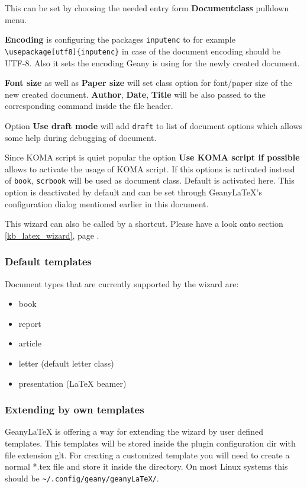 \documentclass[%
paper=a4,%
fontsize=11pt,%
twoside=false,%
DIV18,
headsepline,
plainheadsepline,
footsepline,
plainfootsepline,
bibliography=totoc,%
listof=totoc,%
BCOR10mm,%
parskip=half,%
openany,%
]{scrartcl}
\begin{document}
This can be set by choosing the needed entry form
\textbf{Documentclass} pulldown menu.

\textbf{Encoding} is configuring the packages \texttt{inputenc} to
for example \texttt{\textbackslash usepackage[utf8]\{inputenc\}} in
case of the document encoding should be UTF-8. Also it sets the
encoding Geany is using for the newly created document.

\textbf{Font size} as well as \textbf{Paper size} will set class option
for font/paper size of the new created document. \textbf{Author},
\textbf{Date}, \textbf{Title} will be also passed to the corresponding
command inside the file header.

Option \textbf{Use draft mode} will add \texttt{draft} to list of
document options which allows some help during debugging of document.

Since KOMA script is quiet popular the option \textbf{Use KOMA script
if possible} allows to activate the usage of KOMA script. If this
options is activated instead of \texttt{book}, \texttt{scrbook} will
be used as document class. Default is activated here. This option is
deactivated by default and can be set through Geany\LaTeX{}'s
configuration dialog mentioned earlier in this document.

This wizard can also be called by a shortcut. Please have a look onto
section \ref{kb_latex_wizard}, page \pageref{kb_latex_wizard}.

\subsubsection{Default templates}
Document types that are currently supported by the wizard are:
\begin{itemize}
	\item book
	\item report
	\item article
	\item letter (default letter class)
	\item presentation (\LaTeX{} beamer)
\end{itemize}

\subsubsection{Extending by own templates}
\label{sec:extending_wizard_by_own_templates}
Geany\LaTeX{} is offering a way for extending the wizard by user
defined templates. This templates will be stored inside the plugin
configuration dir with file extension glt. For creating a
customized template you will need to create a normal *.tex file and
store it inside the directory. On most Linux systems this should be
\texttt{\textasciitilde/.config/geany/geanyLaTeX/}.
\end{document}
